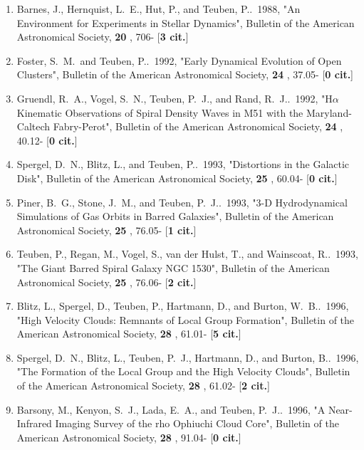 \documentclass[11pt,letterpaper]{article}
\begin{document}
\begin{enumerate}[resume,label=\textbf{\arabic*}.]

\item  
Barnes, J., Hernquist, L.~E., Hut, P., and Teuben, P..\  1988,  "An 
Environment for Experiments in Stellar Dynamics", Bulletin of the American 
Astronomical Society,  {\bf 20} , 706- [{\bf 3 cit.}] 
\item  
Foster, S.~M.~and Teuben, P..\  1992,  "Early Dynamical Evolution of Open 
Clusters", Bulletin of the American Astronomical Society,  {\bf 24} , 
37.05- [{\bf 0 cit.}] 
\item  
Gruendl, R.~A., Vogel, S.~N., Teuben, P.~J., and Rand, R.~J..\  1992,  
"H{$\alpha$} Kinematic Observations of Spiral Density Waves in M51 with the 
Maryland-Caltech Fabry-Perot", Bulletin of the American Astronomical 
Society,  {\bf 24} , 40.12- [{\bf 0 cit.}] 
\item  
Spergel, D.~N., Blitz, L., and Teuben, P..\  1993,  "Distortions in the 
Galactic Disk", Bulletin of the American Astronomical Society,  {\bf 25} , 
60.04- [{\bf 0 cit.}] 

\item  
Piner, B.~G., Stone, J.~M., and Teuben, P.~J..\  1993,  "3-D Hydrodynamical 
Simulations of Gas Orbits in Barred Galaxies", Bulletin of the American 
Astronomical Society,  {\bf 25} , 76.05- [{\bf 1 cit.}] 
\item  
Teuben, P., Regan, M., Vogel, S., van der Hulst, T., and Wainscoat, R..\  
1993,  "The Giant Barred Spiral Galaxy NGC 1530", Bulletin of the American 
Astronomical Society,  {\bf 25} , 76.06- [{\bf 2 cit.}] 
\item  
Blitz, L., Spergel, D., Teuben, P., Hartmann, D., and Burton, W.~B..\  
1996,  "High Velocity Clouds: Remnants of Local Group Formation", Bulletin 
of the American Astronomical Society,  {\bf 28} , 61.01- [{\bf 5 cit.}] 

\item  
Spergel, D.~N., Blitz, L., Teuben, P.~J., Hartmann, D., and Burton, B..\  
1996,  "The Formation of the Local Group and the High Velocity Clouds", 
Bulletin of the American Astronomical Society,  {\bf 28} , 61.02- [{\bf 2 
cit.}] 
\item  
Barsony, M., Kenyon, S.~J., Lada, E.~A., and Teuben, P.~J..\  1996,  "A 
Near-Infrared Imaging Survey of the rho Ophiuchi Cloud Core", Bulletin of 
the American Astronomical Society,  {\bf 28} , 91.04- [{\bf 0 cit.}] 


\end{enumerate}
\end{document}
